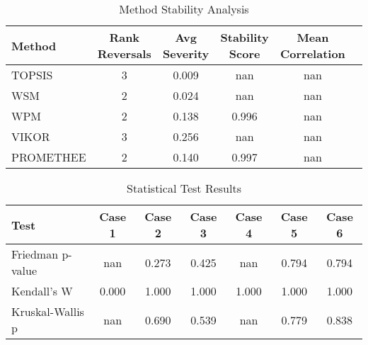 \begin{table}[htbp]
\centering
\caption{Method Stability Analysis}
\begin{tabular}{lccccc}
\hline
Method & Rank Reversals & Avg Severity & Stability Score & Mean Correlation \\
\hline
TOPSIS & 3 & 0.009 & nan & nan \\
WSM & 2 & 0.024 & nan & nan \\
WPM & 2 & 0.138 & 0.996 & nan \\
VIKOR & 3 & 0.256 & nan & nan \\
PROMETHEE & 2 & 0.140 & 0.997 & nan \\
\hline
\end{tabular}
\label{tab:stability}
\end{table}

\begin{table}[htbp]
\centering
\caption{Statistical Test Results}
\begin{tabular}{lcccccc}
\hline
Test & Case 1 & Case 2 & Case 3 & Case 4 & Case 5 & Case 6 \\
\hline
Friedman p-value & nan & 0.273 & 0.425 & nan & 0.794 & 0.794 \\
Kendall's W & 0.000 & 1.000 & 1.000 & 1.000 & 1.000 & 1.000 \\
Kruskal-Wallis p & nan & 0.690 & 0.539 & nan & 0.779 & 0.838 \\
\hline
\end{tabular}
\label{tab:statistics}
\end{table}


